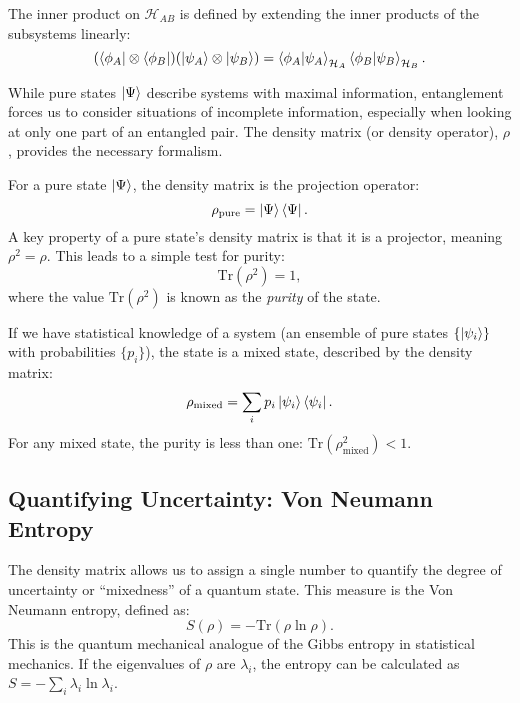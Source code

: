 The inner product on $\mathcal{H}_{AB}$ is defined by extending the inner
products of the subsystems linearly:
\begin{equation}
	(\bra{\phi_A} \otimes \bra{\phi_B}) (\ket{\psi_A} \otimes \ket{\psi_B})
	= \braket{\phi_A | \psi_A}_{\mathcal{H}_A} \braket{\phi_B | \psi_B}_{\mathcal{H}_B}.
\end{equation}

While pure states $\ket{\Psi}$ describe systems with maximal information,
entanglement forces us to consider situations of incomplete information,
especially when looking at only one part of an entangled pair. The
density matrix (or density operator), $\rho$, provides the necessary
formalism.

For a pure state $\ket{\Psi}$, the density matrix is the projection operator:
\begin{equation}
	\rho_{\text{pure}} = \ket{\Psi}\bra{\Psi}.
\end{equation}
A key property of a pure state's density matrix is that it is a projector,
meaning $\rho^2 = \rho$. This leads to a simple test for purity:
\begin{equation}
	\mathrm{Tr}(\rho^2) = 1,
\end{equation}
where the value $\mathrm{Tr}(\rho^2)$ is known as the \textit{purity} of the
state.

If we have statistical knowledge of a system (an ensemble of pure states
$\{\ket{\psi_i}\}$ with probabilities $\{p_i\}$), the state is a
mixed state, described by the density matrix:
\begin{equation}
	\rho_{\text{mixed}} = \sum_i p_i \ket{\psi_i}\bra{\psi_i}.
\end{equation}
For any mixed state, the purity is less than one:
$\mathrm{Tr}(\rho_{\text{mixed}}^2) < 1$.

\subsection{Quantifying Uncertainty: Von Neumann Entropy}
\label{sub:von_neumann_entropy}

The density matrix allows us to assign a single number to quantify the
degree of uncertainty or ``mixedness'' of a quantum state. This measure is the
Von Neumann entropy, defined as:
\begin{equation}
	S(\rho) = - \mathrm{Tr}(\rho \ln \rho).
\end{equation}
This is the quantum mechanical analogue of the Gibbs entropy in statistical
mechanics. If the eigenvalues of $\rho$ are $\lambda_i$, the entropy can be
calculated as $S = - \sum_i \lambda_i \ln \lambda_i$.

